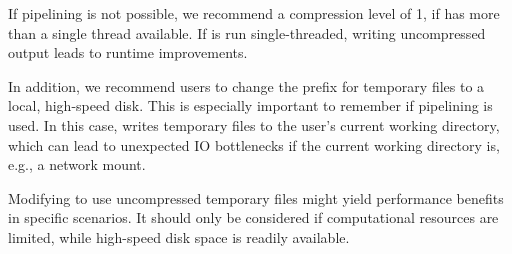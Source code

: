If pipelining is not possible, we recommend a compression level of 1, if \sort has more than a single thread available. If \sort is run single-threaded, writing uncompressed output leads to runtime improvements.

In addition, we recommend users to change the prefix for temporary files to a local, high-speed disk. This is especially important to remember if pipelining is used. In this case, \sort writes temporary files to the user's current working directory, which can lead to unexpected IO bottlenecks if the current working directory is, e.g., a network mount.

Modifying \sort to use uncompressed temporary files might yield performance benefits in specific scenarios. It should only be considered if computational resources are limited, while high-speed disk space is readily available.
